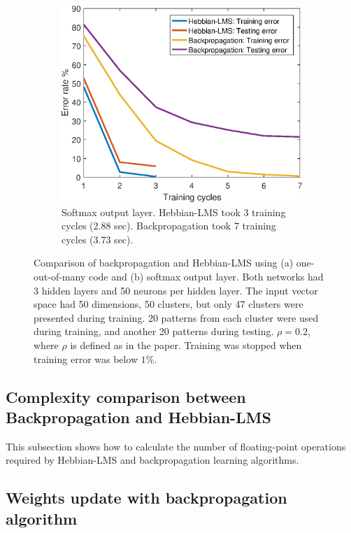 \documentclass[a4paper]{article}
\begin{document}
\begin{figure}[h!]
	\begin{subfigure}[h!]{0.8\textwidth}
		\includegraphics[width=\textwidth]{learning_curve_softmax.eps}
		\caption{Softmax output layer. Hebbian-LMS took 3 training cycles (2.88 sec). Backpropagation took 7 training cycles (3.73 sec).}
		\label{fig:q81a_vel}
	\end{subfigure}
	\caption{Comparison of backpropagation and Hebbian-LMS using (a) one-out-of-many code and (b) softmax output layer. Both networks had 3 hidden layers and 50 neurons per hidden layer. The input vector space had 50 dimensions, 50 clusters, but only 47 clusters were presented during training. 20 patterns from each cluster were used during training, and another 20 patterns during testing. $\rho = 0.2$, where $\rho$ is defined as in the paper. Training was stopped when training error was below $1\%$. }\label{fig:comp}
\end{figure}
\FloatBarrier
	
\subsection{Complexity comparison between Backpropagation and Hebbian-LMS}

This subsection shows how to calculate the number of floating-point operations required by Hebbian-LMS and backpropagation learning algorithms.
	
\subsection{Weights update with backpropagation algorithm}
\end{document}
